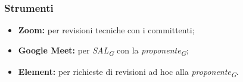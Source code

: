 \subsubsection{Strumenti}

\begin{itemize}
    \item \textbf{Zoom:} per revisioni tecniche con i committenti;
    \item \textbf{Google Meet:} per \textit{SAL}\textsubscript{\textit{G}} con la \textit{proponente}\textsubscript{\textit{G}}; 
    \item \textbf{Element:} per richieste di revisioni ad hoc alla \textit{proponente}\textsubscript{\textit{G}}.
\end{itemize}